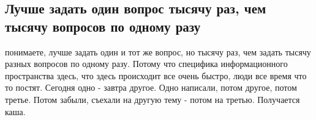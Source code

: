 \subsection{Лучше задать один вопрос тысячу раз, чем тысячу вопросов по одному разу}

понимаете, лучше задать один и тот же вопрос, но тысячу раз, чем задать тысячу
разных вопросов по одному разу. Потому что специфика информационного
пространства здесь, что здесь происходит все очень быстро, люди все время что
то постят. Сегодня одно - завтра другое. Одно написали, потом другое, потом
третье. Потом забыли, съехали на другую тему - потом на третью. Получается
каша.







